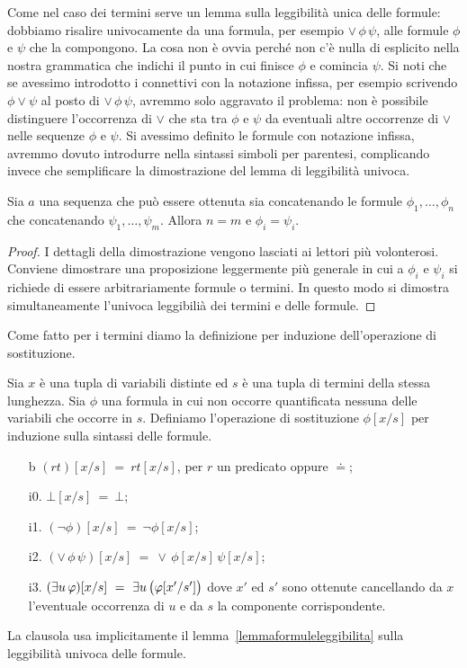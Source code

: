 Come nel caso dei termini serve un lemma sulla leggibilit\`a unica delle formule: dobbiamo risalire univocamente da una formula, per esempio $\mathord\vee\,\phi\,\psi$, alle formule $\phi$ e $\psi$ che la compongono. La cosa non \`e ovvia perch\'e non c'\`e nulla di esplicito nella nostra grammatica che indichi il punto in cui finisce $\phi$ e comincia $\psi$. Si noti che se avessimo introdotto i connettivi con la notazione infissa, per esempio scrivendo $\phi\vee\psi$ al posto di $\mathord\vee\,\phi\,\psi$, avremmo solo aggravato il problema: non \`e possibile distinguere l'occorrenza di $\vee$ che sta tra $\phi$ e $\psi$ da eventuali altre occorrenze di $\vee$ nelle sequenze $\phi$ e $\psi$. Si avessimo definito le formule con notazione infissa, avremmo dovuto introdurre nella sintassi simboli per parentesi, complicando invece che semplificare la dimostrazione del lemma di leggibilit\`a univoca.

\begin{lemma}
\label{lemmaformuleleggibilita}
Sia $a$ una sequenza che pu\`o essere ottenuta sia concatenando le formule $\phi_1,\dots,\phi_n$ che concatenando  
$\psi_1,\dots,\psi_m$. Allora $n=m$ e $\phi_i=\psi_i$.
\end{lemma}
\begin{proof}
I dettagli della dimostrazione vengono lasciati ai lettori pi\`u volonterosi. Conviene dimostrare una proposizione leggermente pi\`u generale in cui a $\phi_i$ e $\psi_i$ si richiede di essere arbitrariamente formule o termini. In questo modo si dimostra simultaneamente l'univoca leggibili\`a dei termini e delle formule.
\end{proof}

Come fatto per i termini diamo la definizione per induzione dell'operazione di sostituzione.

\begin{definition}\label{defsostituzioneformule}
Sia $x$ \`e una tupla di variabili distinte ed $s$ \`e una tupla di termini della stessa lunghezza. Sia $\phi$ una formula in cui non occorre quantificata nessuna delle variabili che occorre in $s$. Definiamo l'operazione di sostituzione \emph{$\phi[x/s]$\/} per induzione sulla sintassi delle formule.
\begin{itemize}
\item[b] $(rt)[x/s]\ =\ r t[x/s]$, per $r$ un predicato oppure $\doteq$;
\item[i0.] $\bot[x/s]\ =\ \bot$;
\item[i1.] $(\neg\phi)[x/s]\ =\ \neg\phi[x/s]$;
\item[i2.] $(\vee\,\phi\,\psi)[x/s]\ =\ \vee\,\phi[x/s]\,\psi[x/s]$;
\item[i3.] $(\exists u\,\varphi)[x/s]\ =\ \exists u\,\big(\varphi[x'/s']\big)$ dove $x'$ ed $s'$ sono ottenute cancellando da $x$ l'eventuale occorrenza di $u$ e da $s$ la componente corrispondente.
\end{itemize}
La clausola  usa implicitamente il lemma~\ref{lemmaformuleleggibilita} sulla leggibilit\`a univoca delle formule.\QED
\end{definition}

